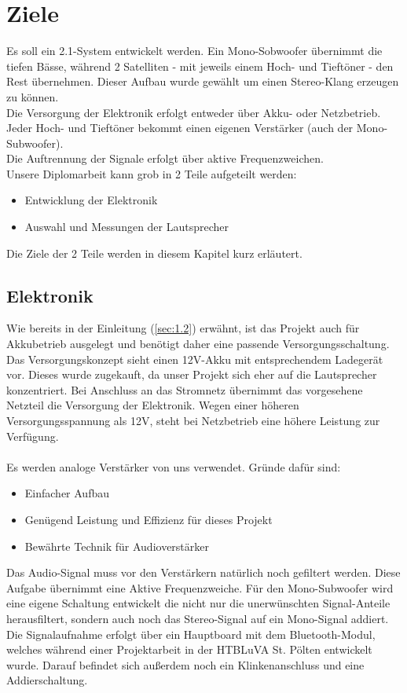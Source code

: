 \section{Ziele}\label{sec:2.1}
Es soll ein 2.1-System entwickelt werden. Ein Mono-Sobwoofer übernimmt die tiefen Bässe, während 2 Satelliten - mit jeweils einem Hoch- und Tieftöner - den Rest übernehmen. Dieser Aufbau wurde gewählt um einen Stereo-Klang erzeugen zu können. \\
Die Versorgung der Elektronik erfolgt entweder über Akku- oder Netzbetrieb. Jeder Hoch- und Tieftöner bekommt einen eigenen Verstärker (auch der Mono-Subwoofer). \\
Die Auftrennung der Signale erfolgt über aktive Frequenzweichen.\\

Unsere Diplomarbeit kann grob in 2 Teile aufgeteilt werden:
\begin{itemize}
	\item Entwicklung der Elektronik
	\item Auswahl und Messungen der Lautsprecher
\end{itemize}
Die Ziele der 2 Teile werden in diesem Kapitel kurz erläutert.

\subsection{Elektronik}\label{subsec:2.1.1}
Wie bereits in der Einleitung (\ref{sec:1.2}) erwähnt, ist das Projekt auch für Akkubetrieb ausgelegt und benötigt daher eine passende Versorgungsschaltung. Das Versorgungskonzept sieht einen 12V-Akku mit entsprechendem Ladegerät vor. Dieses wurde zugekauft, da unser Projekt sich eher auf die Lautsprecher konzentriert. Bei Anschluss an das Stromnetz übernimmt das vorgesehene Netzteil die Versorgung der Elektronik. Wegen einer höheren Versorgungsspannung als 12V, steht bei Netzbetrieb eine höhere Leistung zur Verfügung. \\ \\
Es werden analoge Verstärker von uns verwendet. Gründe dafür sind:
\begin{itemize}
	\item Einfacher Aufbau
	\item Genügend Leistung und Effizienz für dieses Projekt
	\item Bewährte Technik für Audioverstärker
\end{itemize} 
Das Audio-Signal muss vor den Verstärkern natürlich noch gefiltert werden. Diese Aufgabe übernimmt eine Aktive Frequenzweiche. Für den Mono-Subwoofer wird eine eigene Schaltung entwickelt die nicht nur die unerwünschten Signal-Anteile herausfiltert, sondern auch noch das Stereo-Signal auf ein Mono-Signal addiert. \newpage
Die Signalaufnahme erfolgt über ein Hauptboard mit dem Bluetooth-Modul, welches während einer Projektarbeit in der HTBLuVA St. Pölten entwickelt wurde. Darauf befindet sich außerdem noch ein Klinkenanschluss und eine Addierschaltung.

